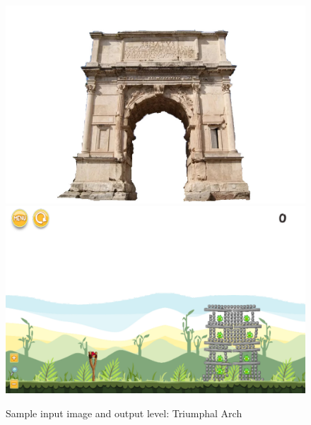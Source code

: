 \documentclass{dalthesis}
\begin{document}
\begin{figure}
	\caption{Sample input image and output level: Triumphal Arch}
  \includegraphics[width=\textwidth,height=\textheight,keepaspectratio]{levels/pictures/buildings/triumphal_arch.jpg}
  \includegraphics[width=\textwidth,height=\textheight,keepaspectratio]{levels/screenshots/buildings/triumphal_arch.png}
\end{figure}
\end{document}
